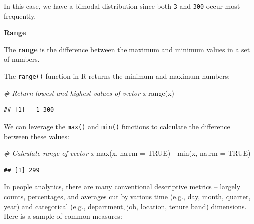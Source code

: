 \documentclass[
]{book}
\newenvironment{Shaded}{\begin{snugshade}}{\end{snugshade}}
\newcommand{\AttributeTok}[1]{\textcolor[rgb]{0.77,0.63,0.00}{#1}}
\newcommand{\CommentTok}[1]{\textcolor[rgb]{0.56,0.35,0.01}{\textit{#1}}}
\newcommand{\ConstantTok}[1]{\textcolor[rgb]{0.00,0.00,0.00}{#1}}
\newcommand{\FunctionTok}[1]{\textcolor[rgb]{0.00,0.00,0.00}{#1}}
\newcommand{\NormalTok}[1]{#1}
\newcommand{\SpecialCharTok}[1]{\textcolor[rgb]{0.00,0.00,0.00}{#1}}
\begin{document}
In this case, we have a bimodal distribution since both \texttt{3} and \texttt{300} occur most frequently.

\textbf{Range}

The \textbf{range} is the difference between the maximum and minimum values in a set of numbers.

The \texttt{range()} function in R returns the minimum and maximum numbers:

\begin{Shaded}
\begin{Highlighting}[]
\CommentTok{\# Return lowest and highest values of vector x}
\FunctionTok{range}\NormalTok{(x)}
\end{Highlighting}
\end{Shaded}

\begin{verbatim}
## [1]   1 300
\end{verbatim}

We can leverage the \texttt{max()} and \texttt{min()} functions to calculate the difference between these values:

\begin{Shaded}
\begin{Highlighting}[]
\CommentTok{\# Calculate range of vector x}
\FunctionTok{max}\NormalTok{(x, }\AttributeTok{na.rm =} \ConstantTok{TRUE}\NormalTok{) }\SpecialCharTok{{-}} \FunctionTok{min}\NormalTok{(x, }\AttributeTok{na.rm =} \ConstantTok{TRUE}\NormalTok{)}
\end{Highlighting}
\end{Shaded}

\begin{verbatim}
## [1] 299
\end{verbatim}

In people analytics, there are many conventional descriptive metrics -- largely counts, percentages, and averages cut by various time (e.g., day, month, quarter, year) and categorical (e.g., department, job, location, tenure band) dimensions. Here is a sample of common measures:
\end{document}
